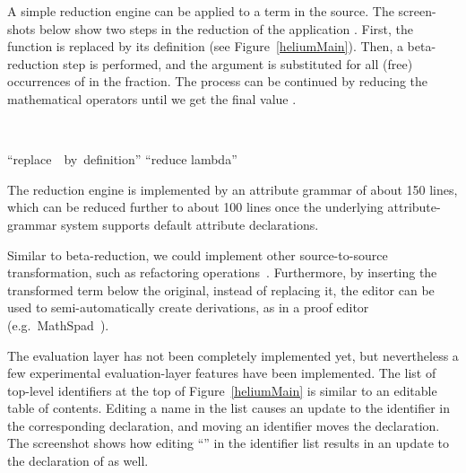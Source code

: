 %


A simple reduction engine can be applied to a term in the source. The screen-shots below show two steps in the reduction of the application . First, the function  is replaced by its definition (see Figure~\ref{heliumMain}). Then, a beta-reduction step is performed, and the argument  is substituted for all (free) occurrences of  in the fraction. The process can be continued by reducing the mathematical operators until we get the final value .

\begin{center}
 \then
 \then
\nopagebreak[4] \\ [2mm]
\begin{small}
\parbox{125mm}{
\hspace*{1.0cm} ``replace~~by~definition''
\hspace{2.08cm}   ``reduce lambda''
}
\end{small}\end{center}


The reduction engine is implemented by an attribute grammar of about 150 lines, which can be reduced further to about 100 lines once the underlying attribute-grammar system supports default attribute declarations.

Similar to beta-reduction, we could implement other source-to-source transformation, such as refactoring operations~\cite{reinke03refactoring}. Furthermore, by inserting the transformed term below the original, instead of replacing it, the editor can be used to semi-automatically create derivations, as in a proof editor (e.g.\ MathSpad~\cite{verhoeven00mathspad}).


The evaluation layer has not been completely implemented yet, but nevertheless a few experimental evaluation-layer features have been implemented. The list of top-level identifiers at the top of Figure~\ref{heliumMain} is similar to an editable table of contents. Editing a name in the list causes an update to the identifier in the corresponding declaration, and moving an identifier moves the declaration. The screenshot shows how editing ``'' in the identifier list results in an update to the declaration of  as well.


